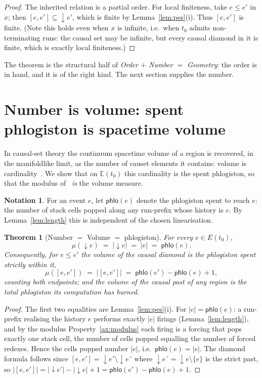 \documentclass[11pt]{article}
\theoremstyle{definition}
\newtheorem{notation}[definition]{Notation}
\theoremstyle{plain}
\newtheorem{theorem}[definition]{Theorem}
\newcommand{\Ev}{\mathbb{E}}
\newcommand{\Evt}{E}
\newcommand{\dpast}[1]{{\downarrow}#1}
\newcommand{\spent}{\mathsf{phlo}}
\newcommand{\meas}{\mu}
\theoremstyle{remark}
\begin{document}
\begin{proof}
The inherited relation is a partial order. For local finiteness, take
$e \le e'$ in $x$; then $[e,e'] \subseteq \dpast{e'}$, which is finite by
Lemma~\ref{lem:pes}(i). Thus $[e,e']$ is finite. (Note this holds even
when $x$ is infinite, i.e.\ when $t_0$ admits non-terminating runs: the
causal set may be infinite, but every causal diamond in it is finite,
which is exactly local finiteness.)
\end{proof}

The theorem is the structural half of \emph{Order $+$ Number $=$
Geometry}: the order is in hand, and it is of the right kind. The next
section supplies the number.

\section{Number is volume: spent phlogiston is spacetime volume}
\label{sec:numbervolume}

In causal-set theory the continuum spacetime volume of a region is
recovered, in the manifoldlike limit, as the number of causet elements
it contains: volume is cardinality~\cite{BLMS,SorkinValdivia}. We show
that on $\Ev(t_0)$ this cardinality is the spent phlogiston, so that the
modulus of~\cite{CostNote} \emph{is} the volume measure.

\begin{notation}
For an event $e$, let $\spent(e)$ denote the phlogiston spent to reach
$e$: the number of stack cells popped along any run-prefix whose history
is $e$. By Lemma~\ref{lem:length} this is independent of the chosen
linearisation.
\end{notation}

\begin{theorem}[Number $=$ Volume $=$ phlogiston]
\label{thm:numbervolume}
For every $e \in \Evt(t_0)$,
\[
  \meas(\dpast e) \;=\; |\dpast e| \;=\; |e| \;=\; \spent(e).
\]
Consequently, for $e \le e'$ the volume of the causal diamond is the
phlogiston spent strictly within it,
\[
  \meas([e,e']) \;=\; |[e,e']| \;=\; \spent(e') - \spent(e) + 1,
\]
counting both endpoints; and the volume of the causal past of any region
is the total phlogiston its computation has burned.
\end{theorem}

\begin{proof}
The first two equalities are Lemma~\ref{lem:pes}(i). For
$|e| = \spent(e)$: a run-prefix realising the history $e$ performs
exactly $|e|$ firings (Lemma~\ref{lem:length}), and by the modulus
Property~\ref{ax:modulus} each firing is a forcing that pops exactly one
stack cell, the number of cells popped equalling the number of forced
redexes. Hence the cells popped number $|e|$, i.e.\ $\spent(e)=|e|$. The
diamond formula follows since $[e,e'] = \dpast{e'} \setminus
\dpast{e}^{\,\circ}$ where $\dpast{e}^{\,\circ} = \dpast e \setminus
\{e\}$ is the strict past, so $|[e,e']| = |\dpast{e'}| - |\dpast e| + 1
= \spent(e') - \spent(e) + 1$.
\end{proof}
\end{document}
